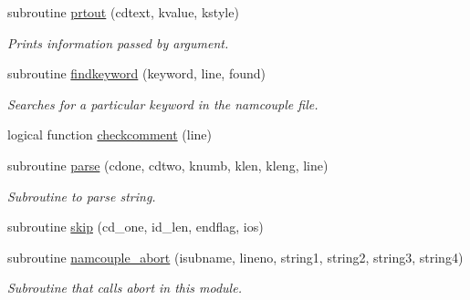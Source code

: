 \begin{DoxyCompactItemize}
subroutine \hyperlink{namespacemod__oasis__namcouple_aee06276b65463fb85340dcc2ab9d67dc}{prtout} (cdtext, kvalue, kstyle)
\begin{DoxyCompactList}\small\item\em Prints information passed by argument. \end{DoxyCompactList}\item 
subroutine \hyperlink{namespacemod__oasis__namcouple_a5f87ffd480c100a94dcdf02f69b23080}{findkeyword} (keyword, line, found)
\begin{DoxyCompactList}\small\item\em Searches for a particular keyword in the namcouple file. \end{DoxyCompactList}\item 
logical function \hyperlink{namespacemod__oasis__namcouple_a4551fbe4bcd69bc6d0d4f6e1ee52ea86}{checkcomment} (line)
\item 
subroutine \hyperlink{namespacemod__oasis__namcouple_a743cf58ab4240aca9ed3e0e2bf1b873c}{parse} (cdone, cdtwo, knumb, klen, kleng, line)
\begin{DoxyCompactList}\small\item\em Subroutine to parse string. \end{DoxyCompactList}\item 
subroutine \hyperlink{namespacemod__oasis__namcouple_a951e3cbd0a1f031399779b6ab3a52112}{skip} (cd\+\_\+one, id\+\_\+len, endflag, ios)
\item 
subroutine \hyperlink{namespacemod__oasis__namcouple_aefebb1d6fd8ac62ea91f9e03265440a3}{namcouple\+\_\+abort} (isubname, lineno, string1, string2, string3, string4)
\begin{DoxyCompactList}\small\item\em Subroutine that calls abort in this module. \end{DoxyCompactList}\end{DoxyCompactItemize}
